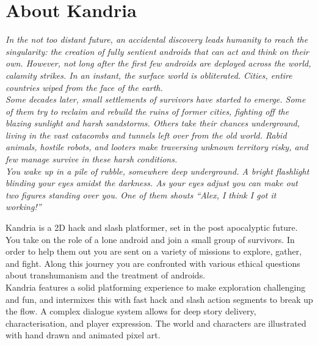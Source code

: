 \section{About Kandria}
\begin{mdframed}[
  roundcorner=5pt,
  backgroundcolor=black!5,
  linewidth=0,
  innertopmargin=+0.5cm,
  innerrightmargin=+0.5cm,
  innerbottommargin=+0.5cm,
  innerleftmargin=+0.5cm]
  \itshape\color{black!90}
  In the not too distant future, an accidental discovery leads humanity to reach the singularity: the creation of fully sentient androids that can act and think on their own. However, not long after the first few androids are deployed across the world, calamity strikes. In an instant, the surface world is obliterated. Cities, entire countries wiped from the face of the earth. \\

  Some decades later, small settlements of survivors have started to emerge. Some of them try to reclaim and rebuild the ruins of former cities, fighting off the blazing sunlight and harsh sandstorms. Others take their chances underground, living in the vast catacombs and tunnels left over from the old world. Rabid animals, hostile robots, and looters make traversing unknown territory risky, and few manage survive in these harsh conditions. \\

  You wake up in a pile of rubble, somewhere deep underground. A bright flashlight blinding your eyes amidst the darkness. As your eyes adjust you can make out two figures standing over you. One of them shouts ``Alex, I think I got it working!''
\end{mdframed}
\vskip1cm

Kandria is a 2D hack and slash platformer, set in the post apocalyptic future. You take on the role of a lone android and join a small group of survivors. In order to help them out you are sent on a variety of missions to explore, gather, and fight. Along this journey you are confronted with various ethical questions about transhumanism and the treatment of androids. \\

Kandria features a solid platforming experience to make exploration challenging and fun, and intermixes this with fast hack and slash action segments to break up the flow. A complex dialogue system allows for deep story delivery, characterisation, and player expression. The world and characters are illustrated with hand drawn and animated pixel art. \\

